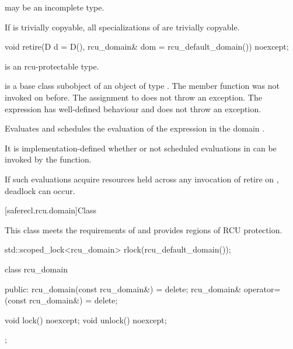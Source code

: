 \pnum
{} may be an incomplete type.

\pnum
If  is trivially copyable, all specializations of
 are trivially copyable.

\begin{itemdecl}
void retire(D d = D(), rcu_domain& dom = rcu_default_domain()) noexcept;
\end{itemdecl}

\begin{itemdescr}

\pnum
\mandates
{} is an rcu-protectable type.

\pnum
\expects
{} is a base class subobject of
an object  of type . The member function
 was not invoked on 
before. The assignment to  does not throw an
exception. The expression  has
well-defined behaviour and does not throw an exception.

\pnum
\effects
Evaluates  and schedules
the evaluation of the expression  in the domain .

\pnum
\remarks
It is implementation-defined whether or not scheduled
evaluations in  can be invoked by the 
function.
\begin{note}
If such evaluations acquire resources held across any invocation of
retire on , deadlock can occur.
\end{note}

\end{itemdescr}

[saferecl.rcu.domain]{Class }


This class meets the requirements of   and provides regions of RCU protection.

\begin{example}
\begin{codeblock}
std::scoped_lock<rcu_domain> rlock(rcu_default_domain());
\end{codeblock}
\end{example}

\begin{codeblock}
class rcu_domain {
public:
  rcu_domain(const rcu_domain&) = delete;
  rcu_domain& operator=(const rcu_domain&) = delete;

  void lock() noexcept;
  void unlock() noexcept;
};
\end{codeblock}

